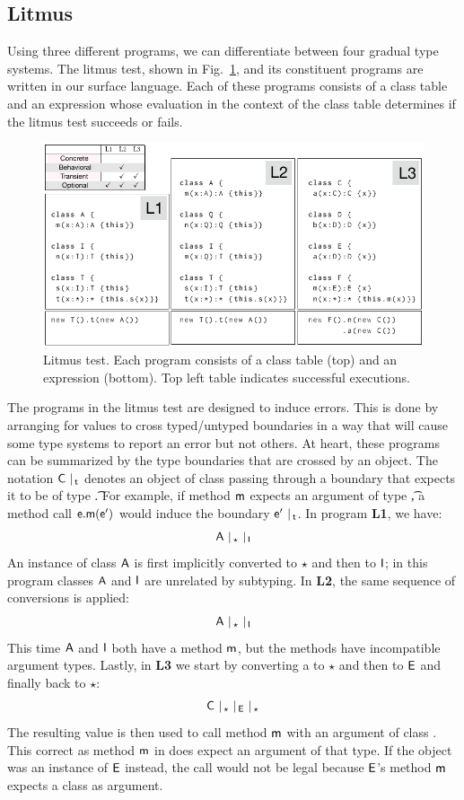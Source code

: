 \documentclass[a4paper,USenglish]{lipics-v2018}
\newcommand{\EM}[1]{\ensuremath{#1}\xspace}
\newcommand{\xt}[1]{{\sf{#1}}}
\newcommand{\EMxt}[1]{\EM{\xt{#1}}}
\newcommand{\m}{\EMxt m}
\newcommand{\A}{\EMxt {A}}
\newcommand{\I}{\EMxt {I}}
\newcommand{\E}{\EMxt {E}}
\newcommand{\any}{\EM{\star}}
\newcommand{\figref}[1]{Fig.~\ref{#1}\xspace}
\begin{document}
\subsection{Litmus}

Using three different programs, we can differentiate between four gradual
type systems. The litmus test, shown in \figref{litmus}, and its
constituent programs are written in our surface language. Each of these
programs consists of a class table and an expression whose evaluation in
the context of the class table determines if the litmus test succeeds or
fails.

\begin{figure}[h] 
\includegraphics[width=.95\columnwidth]{litm}
\caption{Litmus test. Each program consists of a class table (top) and
an expression (bottom). Top left table indicates successful
executions.}\label{litmus}
\end{figure}

The programs in the litmus test are designed to induce errors. This is done by arranging for
values to cross typed/untyped boundaries in a way that will cause some type
systems to report an error but not others. At heart, these programs can 
be summarized by the
type boundaries that are crossed by an object. The
notation $\C ~\vert_{\,\t}$ denotes an object of class \C passing
through a boundary that expects it to be of type \t. For example,
if method \m expects an argument of type \t, a method call $\e.\m(\ep)$ would
induce the boundary $\ep ~\vert_{\,\t}$. 
In program {\bf L1}, we have:
\[\A ~\vert_{\,\any} ~ \vert_{\,\I}\] 
An instance of 
class \A is first implicitly converted to \any and then to \I; in this program
classes \A and \I are unrelated by subtyping. In {\bf L2}, the same sequence
of conversions is applied:
\[\A~ \vert_{\,\any} ~ \vert_{\,\I}\] 
This time \A and \I both have a
method \m, but the methods have incompatible argument types. Lastly, in
{\bf L3} we start by converting a \C to \any and then to \E
and finally back to \any:
\[\C~ \vert_{\,\any}~\vert_{\,\E}~\vert_{\,\any}\]
The resulting value is then used to call method \m with an argument of class \C.
This correct as method \m in \C does expect an
argument of that type. If the object was an instance of \E instead, the call
would not be legal because \E's method \m expects a class \D as argument.
\end{document}

